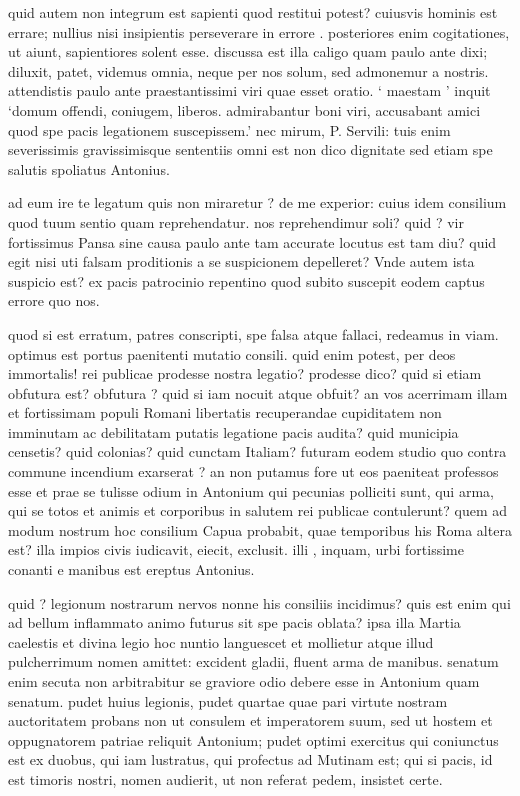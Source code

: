  quid autem non integrum est sapienti quod restitui potest? cuiusvis hominis est errare; nullius nisi insipientis perseverare in errore . posteriores enim cogitationes, ut aiunt, sapientiores solent esse. discussa est illa caligo quam paulo ante dixi; diluxit, patet, videmus omnia, neque per nos solum, sed admonemur a nostris. attendistis paulo ante praestantissimi viri quae esset oratio. ` maestam ' inquit `domum offendi, coniugem, liberos. admirabantur boni viri, accusabant amici quod spe pacis legationem suscepissem.' nec mirum, P. Servili: tuis enim severissimis gravissimisque sententiis omni est non dico dignitate sed etiam spe salutis spoliatus Antonius.

 ad eum ire te legatum quis non miraretur ? de me experior: cuius idem consilium quod tuum sentio quam reprehendatur. nos reprehendimur soli? quid ? vir fortissimus Pansa sine causa paulo ante tam accurate locutus est tam diu? quid egit nisi uti falsam proditionis a se suspicionem depelleret? Vnde autem ista suspicio est? ex pacis patrocinio repentino quod subito suscepit eodem captus errore quo nos.

 quod si est erratum, patres conscripti, spe falsa atque fallaci, redeamus in viam. optimus est portus paenitenti mutatio consili. quid enim potest, per deos immortalis! rei publicae prodesse nostra legatio? prodesse dico? quid si etiam obfutura est? obfutura ? quid si iam nocuit atque obfuit? an vos acerrimam illam et fortissimam populi Romani libertatis recuperandae cupiditatem non imminutam ac debilitatam putatis legatione pacis audita? quid municipia censetis? quid colonias? quid cunctam Italiam? futuram eodem studio quo contra commune incendium exarserat ? an non putamus fore ut eos paeniteat professos esse et prae se tulisse odium in Antonium qui pecunias polliciti sunt, qui arma, qui se totos et animis et corporibus in salutem rei publicae contulerunt? quem ad modum nostrum hoc consilium Capua probabit, quae temporibus his Roma altera est? illa impios civis iudicavit, eiecit, exclusit. illi , inquam, urbi fortissime conanti e manibus est ereptus Antonius.

 quid ? legionum nostrarum nervos nonne his consiliis incidimus? quis est enim qui ad bellum inflammato animo futurus sit spe pacis oblata? ipsa illa Martia caelestis et divina legio hoc nuntio languescet et mollietur atque illud pulcherrimum nomen amittet: excident gladii, fluent arma de manibus. senatum enim secuta non arbitrabitur se graviore odio debere esse in Antonium quam senatum. pudet huius legionis, pudet quartae quae pari virtute nostram auctoritatem probans non ut consulem et imperatorem suum, sed ut hostem et oppugnatorem patriae reliquit Antonium; pudet optimi exercitus qui coniunctus est ex duobus, qui iam lustratus, qui profectus ad Mutinam est; qui si pacis, id est timoris nostri, nomen audierit, ut non referat pedem, insistet certe.

